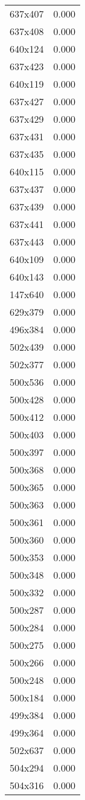 \begin{table}
\begin{tabular}{lr}
637x407 & 0.000 \\
637x408 & 0.000 \\
640x124 & 0.000 \\
637x423 & 0.000 \\
640x119 & 0.000 \\
637x427 & 0.000 \\
637x429 & 0.000 \\
637x431 & 0.000 \\
637x435 & 0.000 \\
640x115 & 0.000 \\
637x437 & 0.000 \\
637x439 & 0.000 \\
637x441 & 0.000 \\
637x443 & 0.000 \\
640x109 & 0.000 \\
640x143 & 0.000 \\
147x640 & 0.000 \\
629x379 & 0.000 \\
496x384 & 0.000 \\
502x439 & 0.000 \\
502x377 & 0.000 \\
500x536 & 0.000 \\
500x428 & 0.000 \\
500x412 & 0.000 \\
500x403 & 0.000 \\
500x397 & 0.000 \\
500x368 & 0.000 \\
500x365 & 0.000 \\
500x363 & 0.000 \\
500x361 & 0.000 \\
500x360 & 0.000 \\
500x353 & 0.000 \\
500x348 & 0.000 \\
500x332 & 0.000 \\
500x287 & 0.000 \\
500x284 & 0.000 \\
500x275 & 0.000 \\
500x266 & 0.000 \\
500x248 & 0.000 \\
500x184 & 0.000 \\
499x384 & 0.000 \\
499x364 & 0.000 \\
502x637 & 0.000 \\
504x294 & 0.000 \\
504x316 & 0.000 \\

\end{tabular}
\end{table}
